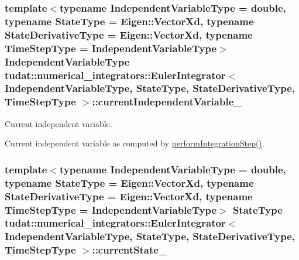 \subsubsection[{\texorpdfstring{current\+Independent\+Variable\+\_\+}{currentIndependentVariable_}}]{\setlength{\rightskip}{0pt plus 5cm}template$<$typename Independent\+Variable\+Type  = double, typename State\+Type  = Eigen\+::\+Vector\+Xd, typename State\+Derivative\+Type  = Eigen\+::\+Vector\+Xd, typename Time\+Step\+Type  = Independent\+Variable\+Type$>$ Independent\+Variable\+Type {\bf tudat\+::numerical\+\_\+integrators\+::\+Euler\+Integrator}$<$ Independent\+Variable\+Type, State\+Type, State\+Derivative\+Type, Time\+Step\+Type $>$\+::current\+Independent\+Variable\+\_\+\hspace{0.3cm}{\ttfamily [protected]}}\hypertarget{classtudat_1_1numerical__integrators_1_1EulerIntegrator_a796713263d79972f32b6a6d600cb34ee}{}\label{classtudat_1_1numerical__integrators_1_1EulerIntegrator_a796713263d79972f32b6a6d600cb34ee}


Current independent variable. 

Current independent variable as computed by \hyperlink{classtudat_1_1numerical__integrators_1_1EulerIntegrator_a6ff2ab6fbde6cb97cfe77961963e4910}{perform\+Integration\+Step()}. 
\subsubsection[{\texorpdfstring{current\+State\+\_\+}{currentState_}}]{\setlength{\rightskip}{0pt plus 5cm}template$<$typename Independent\+Variable\+Type  = double, typename State\+Type  = Eigen\+::\+Vector\+Xd, typename State\+Derivative\+Type  = Eigen\+::\+Vector\+Xd, typename Time\+Step\+Type  = Independent\+Variable\+Type$>$ State\+Type {\bf tudat\+::numerical\+\_\+integrators\+::\+Euler\+Integrator}$<$ Independent\+Variable\+Type, State\+Type, State\+Derivative\+Type, Time\+Step\+Type $>$\+::current\+State\+\_\+\hspace{0.3cm}{\ttfamily [protected]}}\hypertarget{classtudat_1_1numerical__integrators_1_1EulerIntegrator_a923da3b83abbfd6ac4ff9da7a9695eda}{}\label{classtudat_1_1numerical__integrators_1_1EulerIntegrator_a923da3b83abbfd6ac4ff9da7a9695eda}


